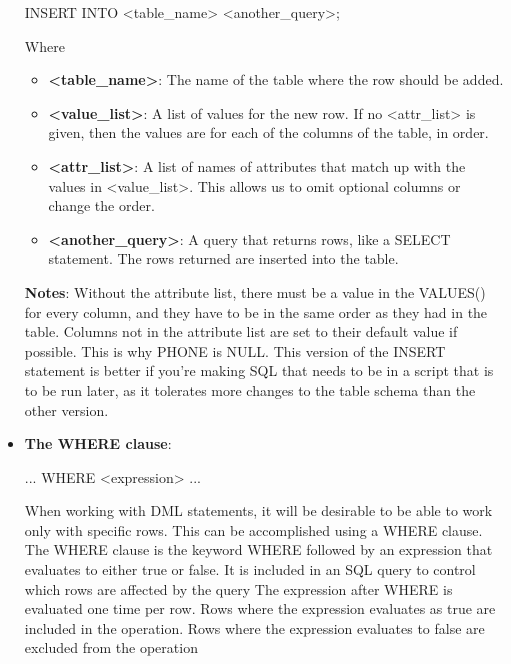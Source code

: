 \documentclass{report}
\begin{document}
\begin{itemize}
\begin{sqlcode}
                INSERT INTO <table_name>
                    <another_query>;
            \end{sqlcode}
            \bigbreak \noindent 
            Where 
            \begin{itemize}
                    \item \textbf{<table\_name>}: The name of the table where the row should be added.
                    \item \textbf{<value\_list>}: A list of values for the new row. If no <attr\_list> is given, then the values are for each of the columns of the table, in order.
                    \item \textbf{<attr\_list>}: A list of names of attributes that match up with the values in <value\_list>. This allows us to omit optional columns or change the order.
                    \item \textbf{<another\_query>}: A query that returns rows, like a SELECT statement. The rows returned are inserted into the table.
            \end{itemize}
            \bigbreak \noindent 
            \textbf{Notes}: Without the attribute list, there must be a value in the VALUES() for every column, and they have to be in the same order as they had in the table.
            \bigbreak \noindent 
            Columns not in the attribute list are set to their default value if possible. This is why PHONE is NULL. This version of the INSERT statement is better if you’re making SQL that needs to be in a script that is to be run later, as it tolerates more changes to the table schema than the other version.
        \item \textbf{The WHERE clause}:
            \bigbreak \noindent 
            \begin{sqlcode}
            ... WHERE <expression> ...
            \end{sqlcode}
            \bigbreak \noindent 
            When working with DML statements, it will be desirable to be able to work only with specific rows. This can be accomplished using a WHERE clause.
            \bigbreak \noindent 
            The WHERE clause is the keyword WHERE followed by an expression that evaluates to either true or false. It is included in an SQL query to control which rows are affected by the query
            \bigbreak \noindent 
            The expression after WHERE is evaluated one time per row. Rows where the expression evaluates as true are included in the operation. Rows where the expression evaluates to false are excluded from the operation

\end{itemize}
\end{document}
